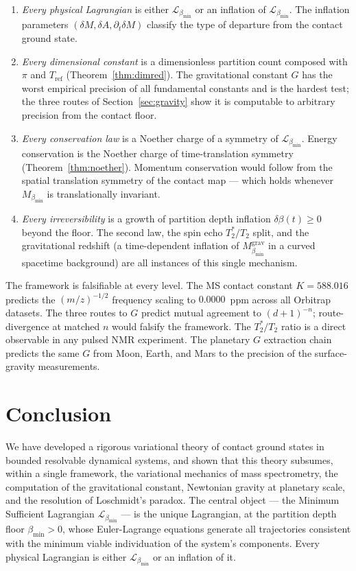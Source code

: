 \documentclass[12pt, a4paper]{article}
\theoremstyle{plain}
\theoremstyle{definition}
\theoremstyle{remark}
\newcommand{\bmin}{\beta_{\min}}
\newcommand{\Lmin}{\mathcal{L}_{\bmin}}
\begin{document}
\begin{enumerate}[label=(\roman*)]
  \item \emph{Every physical Lagrangian} is either $\Lmin$ or an inflation of
  $\Lmin$. The inflation parameters $(\delta M, \delta A, \partial_t\delta M)$
  classify the type of departure from the contact ground state.
  \item \emph{Every dimensional constant} is a dimensionless partition count
  composed with $\pi$ and $T_{\mathrm{ref}}$ (Theorem~\ref{thm:dimred}).
  The gravitational constant $G$ has the worst empirical precision of all
  fundamental constants and is the hardest test; the three routes of
  Section~\ref{sec:gravity} show it is computable to arbitrary precision from
  the contact floor.
  \item \emph{Every conservation law} is a Noether charge of a symmetry of
  $\Lmin$. Energy conservation is the Noether charge of time-translation
  symmetry (Theorem~\ref{thm:noether}). Momentum conservation would follow
  from the spatial translation symmetry of the contact map --- which holds
  whenever $M_{\bmin}$ is translationally invariant.
  \item \emph{Every irreversibility} is a growth of partition depth inflation
  $\delta\beta(t) \geq 0$ beyond the floor. The second law, the spin echo
  $T_2^*/T_2$ split, and the gravitational redshift (a time-dependent inflation
  of $M_{\bmin}^{\mathrm{grav}}$ in a curved spacetime background) are all
  instances of this single mechanism.
\end{enumerate}

The framework is falsifiable at every level. The MS contact constant $K = 588.016$
predicts the $(m/z)^{-1/2}$ frequency scaling to $0.0000$~ppm across all
Orbitrap datasets. The three routes to $G$ predict mutual agreement to $(d+1)^{-n}$;
route-divergence at matched $n$ would falsify the framework. The $T_2^*/T_2$
ratio is a direct observable in any pulsed NMR experiment. The planetary $G$
extraction chain predicts the same $G$ from Moon, Earth, and Mars to the
precision of the surface-gravity measurements.

\section{Conclusion}
\label{sec:conclusion}

We have developed a rigorous variational theory of contact ground states in
bounded resolvable dynamical systems, and shown that this theory subsumes,
within a single framework, the variational mechanics of mass spectrometry,
the computation of the gravitational constant, Newtonian gravity at planetary
scale, and the resolution of Loschmidt's paradox. The central object --- the
Minimum Sufficient Lagrangian $\Lmin$ --- is the unique Lagrangian, at the
partition depth floor $\bmin > 0$, whose Euler-Lagrange equations generate all
trajectories consistent with the minimum viable individuation of the system's
components. Every physical Lagrangian is either $\Lmin$ or an inflation of it.
\end{document}
